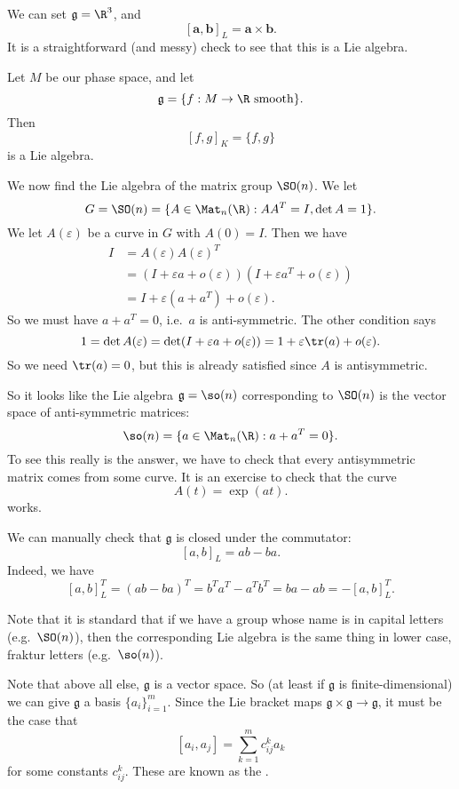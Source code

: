 \documentclass[a4paper]{article}
\begin{document}
\begin{eg}
  We can set $\mathfrak{g} = \R^3$, and
  \[
    [\mathbf{a}, \mathbf{b}]_L = \mathbf{a} \times \mathbf{b}.
  \]
  It is a straightforward (and messy) check to see that this is a Lie algebra.
\end{eg}

\begin{eg}
  Let $M$ be our phase space, and let
  \[
    \mathfrak{g} = \{f: M \to \R \text{ smooth}\}.
  \]
  Then
  \[
    [f, g]_K = \{f, g\}
  \]
  is a Lie algebra.
\end{eg}

\begin{eg}
  We now find the Lie algebra of the matrix group $\SO(n)$. We let
  \[
    G = \SO(n) = \{A \in \Mat_n(\R): AA^T = I, \det A = 1\}.
  \]
  We let $A(\varepsilon)$ be a curve in $G$ with $A(0) = I$. Then we have
  \begin{align*}
    I &= A(\varepsilon) A(\varepsilon)^T \\
    &= (I + \varepsilon a + o(\varepsilon))(I + \varepsilon a^T + o(\varepsilon))\\
    &= I + \varepsilon(a + a^T) + o(\varepsilon).
  \end{align*}
  So we must have $a + a^T = 0$, i.e.\ $a$ is anti-symmetric. The other condition says
  \[
    1 = \det A(\varepsilon) = \det (I + \varepsilon a + o(\varepsilon)) = 1 + \varepsilon \tr(a) + o(\varepsilon).
  \]
  So we need $\tr (a) = 0$, but this is already satisfied since $A$ is antisymmetric.

  So it looks like the Lie algebra $\mathfrak{g} = \so(n)$ corresponding to $\SO(n)$ is the vector space of anti-symmetric matrices:
  \[
    \so(n) = \{a \in \Mat_n(\R): a + a^T = 0\}.
  \]
  To see this really is the answer, we have to check that every antisymmetric matrix comes from some curve. It is an exercise to check that the curve
  \[
    A(t) = \exp(at).
  \]
  works.

  We can manually check that $\mathfrak{g}$ is closed under the commutator:
  \[
    [a, b]_L = ab - ba.
  \]
  Indeed, we have
  \[
    [a, b]_L^T = (ab - ba)^T = b^T a^T - a^T b^T = ba - ab = - [a, b]_L^T.
  \]
\end{eg}
Note that it is standard that if we have a group whose name is in capital letters (e.g.\ $\SO(n)$), then the corresponding Lie algebra is the same thing in lower case, fraktur letters (e.g.\ $\so(n)$).

Note that above all else, $\mathfrak{g}$ is a vector space. So (at least if $\mathfrak{g}$ is finite-dimensional) we can give $\mathfrak{g}$ a basis $\{a_i\}_{i = 1}^m$. Since the Lie bracket maps $\mathfrak{g} \times \mathfrak{g} \to \mathfrak{g}$, it must be the case that
\[
  [a_i, a_j] = \sum_{k = 1}^m c_{ij}^k a_k
\]
for some constants $c_{ij}^k$. These are known as the .
\end{document}

